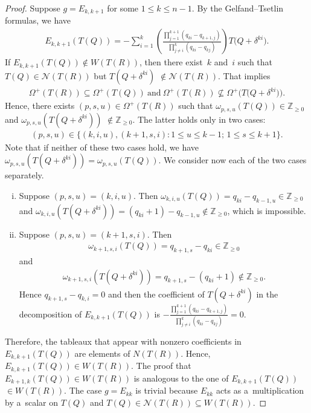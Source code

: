 \documentclass[11pt]{article}
\numberwithin{equation}{section}
\begin{document}
\begin{proof}
Suppose $g=E_{k,k+1}$ for some $1\leq k\leq n-1$.
By the Gelfand--Tsetlin formulas, we have
\begin{gather*}
E_{k,k+1}(T(Q))=-\sum\limits_{i=1}^{k}\left(\frac{\prod\limits_{j=1}^{k+1}(q_{ki}-q_{k+1,j})}{\prod\limits_{j\neq
i}^{k}(q_{ki}-q_{kj})}\right)T\big(Q+\delta^{ki}\big).
\end{gather*}
If $E_{k,k+1}(T(Q))\notin W(T(R))$, then there exist~$k$ and~$i$ such that $T(Q)\in \mathcal{N}(T(R))$ but
$T(Q+\delta^{ki})$ $\notin\mathcal{N}(T(R))$.
That implies
\begin{gather*}
\Omega^{+}(T(R))\subseteq\Omega^{+}(T(Q))~\text{and}~\Omega^{+}(T(R))\nsubseteq\Omega^{+}\big(T\big(Q+\delta^{ki}\big)\big).
\end{gather*}
Hence, there exists $(p,s,u)\in\Omega^{+}(T(R))$ such that $\omega_{p,s,u}(T(Q))\in\mathbb{Z}_{\geq 0}$ and
$\omega_{p,s,u}(T(Q+\delta^{ki}))$ $\notin\mathbb{Z}_{\geq 0}$.
The latter holds only in two cases:
\begin{gather*}
(p,s,u)\in \{(k,i,u), (k+1,s,i): 1\leq u\leq k-1; \, 1\leq s\leq k+1\}.
\end{gather*}
Note that if neither of these two cases hold, we have $\omega_{p,s,u}(T(Q+\delta^{ki}))=\omega_{p,s,u}(T(Q))$.
We consider now each of the two cases separately.
\begin{enumerate}[(i)]\itemsep=0pt
\item Suppose $(p,s,u)=(k,i,u)$.
Then $\omega_{k,i,u}(T(Q))=q_{ki}-q_{k-1,u}\in\mathbb{Z}_{\geq 0}$ and
$\omega_{k,i,u}(T(Q+\delta^{ki}))=(q_{ki}+1)-q_{k-1,u}\notin \mathbb{Z}_{\geq 0}$, which is impossible.
\item Suppose $(p,s,u)=(k+1,s,i)$.
Then
\begin{gather*}
\omega_{k+1,s,i}(T(Q))=q_{k+1,s}-q_{ki}\in\mathbb{Z}_{\geq 0}
\end{gather*}
{and}
\begin{gather*}
\omega_{k+1,s,i}(T(Q+\delta^{ki}))=q_{k+1,s}-(q_{ki}+1)\notin \mathbb{Z}_{\geq 0}.
\end{gather*}
Hence $q_{k+1,s}-q_{k,i}=0$ and then the coef\/f\/icient of $T(Q+\delta^{ki})$ in the decomposition of $E_{k,k+1}(T(Q))$ is
$-\frac{\prod\limits_{j=1}^{k+1}(q_{ki}-q_{k+1,j})}{\prod\limits_{j\neq i}^{k}(q_{ki}-q_{kj})}=0$.
\end{enumerate}
Therefore, the tableaux that appear with nonzero coef\/f\/icients in $E_{k,k+1}(T(Q))$ are elements of $N(T(R))$.
Hence, $E_{k,k+1}(T(Q))\in W(T(R))$.
The proof that $E_{k+1,k}(T(Q))\in W(T(R))$ is analogous to the one of $E_{k,k+1}(T(Q))$ $\in W(T(R))$.
The case $g=E_{kk}$ is trivial because $E_{kk}$ acts as a~multiplication by a~scalar on $T(Q)$ and
$T(Q)\in\mathcal{N}(T(R))\subseteq W(T(R))$.
\end{proof}
\end{document}
